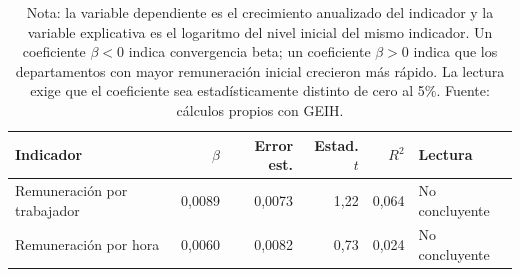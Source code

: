 \begin{table}[H]
\centering
\caption{Convergencia beta de la remuneración laboral departamental, 2010--2025}
\label{tab:dept_remuneracion_convergencia_24}
\small
\begin{tabular}{lrrrrl}
\toprule
Indicador & $\beta$ & Error est. & Estad. $t$ & $R^2$ & Lectura \\
\midrule
Remuneración por trabajador & 0,0089 & 0,0073 & 1,22 & 0,064 & No concluyente \\
Remuneración por hora & 0,0060 & 0,0082 & 0,73 & 0,024 & No concluyente \\
\bottomrule
\end{tabular}
\caption*{\footnotesize Nota: la variable dependiente es el crecimiento anualizado del indicador y la variable explicativa es el logaritmo del nivel inicial del mismo indicador. Un coeficiente $\beta<0$ indica convergencia beta; un coeficiente $\beta>0$ indica que los departamentos con mayor remuneración inicial crecieron más rápido. La lectura exige que el coeficiente sea estadísticamente distinto de cero al 5\%. Fuente: cálculos propios con GEIH.}
\end{table}
